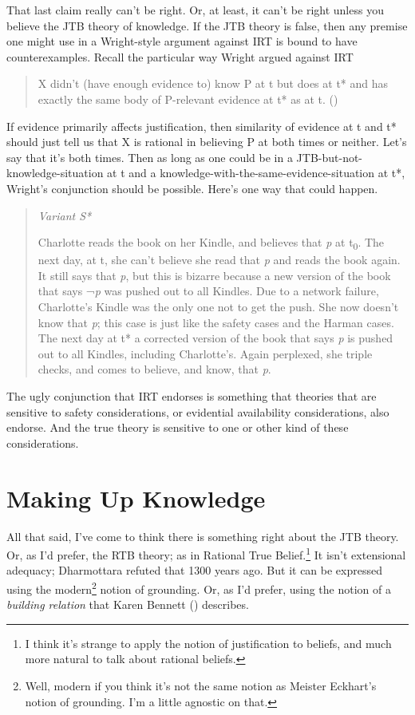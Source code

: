 \documentclass[
  10pt,
  letterpaper,
  twoside]{scrbook}
\begin{document}
That last claim really can't be right. Or, at least, it can't be right
unless you believe the JTB theory of knowledge. If the JTB theory is
false, then any premise one might use in a Wright-style argument against
IRT is bound to have counterexamples. Recall the particular way Wright
argued against IRT

\begin{quote}
X didn't (have enough evidence to) know P at t but does at t* and has
exactly the same body of P-relevant evidence at t* as at t.
()
\end{quote}

If evidence primarily affects justification, then similarity of evidence
at t and t* should just tell us that X is rational in believing P at
both times or neither. Let's say that it's both times. Then as long as
one could be in a JTB-but-not-knowledge-situation at t and a
knowledge-with-the-same-evidence-situation at t*, Wright's conjunction
should be possible. Here's one way that could happen.

\begin{quote}
\emph{Variant S*}

Charlotte reads the book on her Kindle, and believes that \emph{p} at
t\textsubscript{0}. The next day, at t, she can't believe she read that
\emph{p} and reads the book again. It still says that \emph{p}, but this
is bizarre because a new version of the book that says ¬\emph{p} was
pushed out to all Kindles. Due to a network failure, Charlotte's Kindle
was the only one not to get the push. She now doesn't know that
\emph{p}; this case is just like the safety cases and the Harman cases.
The next day at t* a corrected version of the book that says \emph{p} is
pushed out to all Kindles, including Charlotte's. Again perplexed, she
triple checks, and comes to believe, and know, that \emph{p}.
\end{quote}

The ugly conjunction that IRT endorses is something that theories that
are sensitive to safety considerations, or evidential availability
considerations, also endorse. And the true theory is sensitive to one or
other kind of these considerations.

\section{Making Up Knowledge}\label{sec-building}

All that said, I've come to think there is something right about the JTB
theory. Or, as I'd prefer, the RTB theory; as in Rational True
Belief.\footnote{I think it's strange to apply the notion of
  justification to beliefs, and much more natural to talk about rational
  beliefs.} It isn't extensional adequacy; Dharmottara refuted that 1300
years ago. But it can be expressed using the modern\footnote{Well,
  modern if you think it's not the same notion as Meister Eckhart's
  notion of grounding. I'm a little agnostic on that.} notion of
grounding. Or, as I'd prefer, using the notion of a \emph{building
relation} that Karen Bennett ()
describes.
\end{document}
